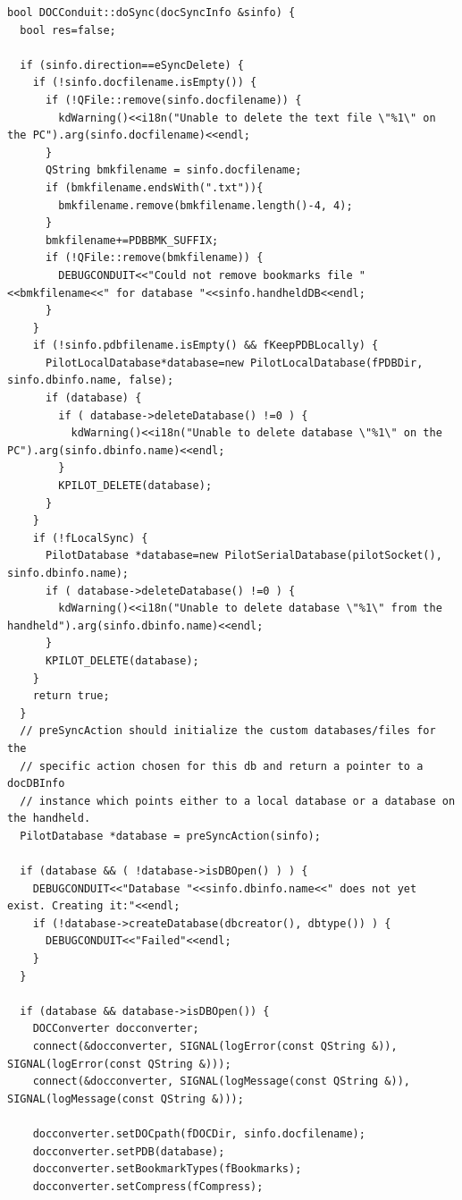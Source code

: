 \documentclass[10pt,a4paper]{article}
\begin{document}
{\footnotesize
\begin{verbatim}
bool DOCConduit::doSync(docSyncInfo &sinfo) {
  bool res=false;
  
  if (sinfo.direction==eSyncDelete) {
    if (!sinfo.docfilename.isEmpty()) {
      if (!QFile::remove(sinfo.docfilename)) {
        kdWarning()<<i18n("Unable to delete the text file \"%1\" on the PC").arg(sinfo.docfilename)<<endl;
      }
      QString bmkfilename = sinfo.docfilename;
      if (bmkfilename.endsWith(".txt")){
        bmkfilename.remove(bmkfilename.length()-4, 4);
      }
      bmkfilename+=PDBBMK_SUFFIX;
      if (!QFile::remove(bmkfilename)) {
        DEBUGCONDUIT<<"Could not remove bookmarks file "<<bmkfilename<<" for database "<<sinfo.handheldDB<<endl;
      }
    }
    if (!sinfo.pdbfilename.isEmpty() && fKeepPDBLocally) {
      PilotLocalDatabase*database=new PilotLocalDatabase(fPDBDir, sinfo.dbinfo.name, false);
      if (database) {
        if ( database->deleteDatabase() !=0 ) {
          kdWarning()<<i18n("Unable to delete database \"%1\" on the PC").arg(sinfo.dbinfo.name)<<endl;
        }
        KPILOT_DELETE(database);
      }
    }
    if (!fLocalSync) {
      PilotDatabase *database=new PilotSerialDatabase(pilotSocket(), sinfo.dbinfo.name);
      if ( database->deleteDatabase() !=0 ) {
        kdWarning()<<i18n("Unable to delete database \"%1\" from the handheld").arg(sinfo.dbinfo.name)<<endl;
      }
      KPILOT_DELETE(database);
    }
    return true;
  }
  // preSyncAction should initialize the custom databases/files for the
  // specific action chosen for this db and return a pointer to a docDBInfo
  // instance which points either to a local database or a database on the handheld.
  PilotDatabase *database = preSyncAction(sinfo);

  if (database && ( !database->isDBOpen() ) ) {
    DEBUGCONDUIT<<"Database "<<sinfo.dbinfo.name<<" does not yet exist. Creating it:"<<endl;
    if (!database->createDatabase(dbcreator(), dbtype()) ) {
      DEBUGCONDUIT<<"Failed"<<endl;
    }
  }

  if (database && database->isDBOpen()) {
    DOCConverter docconverter;
    connect(&docconverter, SIGNAL(logError(const QString &)), SIGNAL(logError(const QString &)));
    connect(&docconverter, SIGNAL(logMessage(const QString &)), SIGNAL(logMessage(const QString &)));

    docconverter.setDOCpath(fDOCDir, sinfo.docfilename);
    docconverter.setPDB(database);
    docconverter.setBookmarkTypes(fBookmarks);
    docconverter.setCompress(fCompress);


\end{verbatim}}
\end{document}
